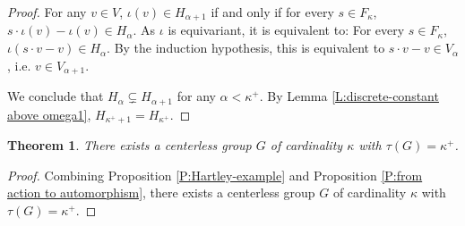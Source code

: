 \documentclass[11pt]{amsart}
\theoremstyle{plain}
\newtheorem{theorem}{Theorem}[section]
\theoremstyle{definition}
\newenvironment{claimproof}[1][\proofname]
  {\proof[#1]\renewcommand*\qedsymbol{$\square$ (claim)}}
  {\endproof}
\begin{document}
\begin{proof}
\begin{claimproof}
        For any $v\in V$, $\iota(v)\in H_{\alpha+1}$ if and only if for every $s\in F_\kappa$, $s\cdot \iota(v)-\iota(v)\in H_\alpha$. As $\iota$ is equivariant, it is equivalent to: For every $s\in F_\kappa$, $\iota(s\cdot v-v)\in H_\alpha$. By the induction hypothesis, this is equivalent to $s\cdot v-v\in V_\alpha$, i.e. $v\in V_{\alpha+1}$.
    \end{claimproof}

    We conclude that $H_{\alpha}\subsetneq H_{\alpha+1}$ for any $\alpha<\kappa^+$. By Lemma \ref{L:discrete-constant above omega1}, $H_{\kappa^++1}=H_{\kappa^+}$.
\end{proof}



\begin{theorem}\label{T:main}
    There exists a centerless group $G$ of cardinality $\kappa$ with $\tau(G)=\kappa^+$.
\end{theorem}
\begin{proof}
    Combining Proposition \ref{P:Hartley-example} and Proposition \ref{P:from action to automorphism}, there exists a centerless group $G$ of cardinality $\kappa$ with $\tau(G)=\kappa^+$.
\end{proof}

 
\end{document}
